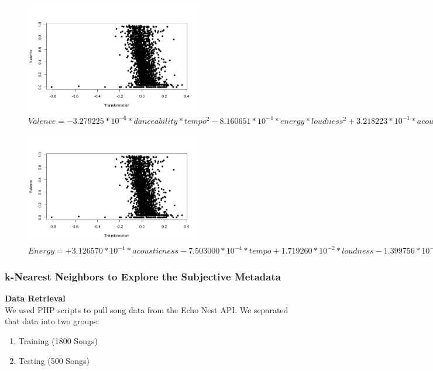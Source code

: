 \documentclass{article}
\begin{document}
\begin{figure}[H]
  \includegraphics[width=3in]{../images/map_valence.png}
  \caption{$ Valence =
      -3.279225 * 10^{-6} * danceability * tempo^{2}
      -8.160651 * 10^{-4} * energy * loudness^{2}
      +3.218223 * 10^{-1} * acousticness * energy^{2}
      -3.279225 * 10^{-6} * liveness * speechiness
      +3.793979 * 10^{-4} * tempo * energy
      -7.492498 * 10^{-3} * loudness * acousticness
      +7.001209 * 10^{-2} * instrumentalness * danceability
      -6.132415 * 10^{-4} * valence * loudness
      +1.359087 * 10^{-2} * energy * loudness *danceability^{2} $}
  \label{valence_mapping}
\end{figure}

\begin{figure}[H]
  \includegraphics[width=3in]{../images/map_valence.png}
  \caption{$ Energy =
      +3.126570 * 10^{-1} * acousticness
      -7.503000 * 10^{-4} * tempo
      +1.719260 * 10^{-2} * loudness
      -1.399756 * 10^{-1} * valence
      +2.950410 * 10^{-2} * danceability
      -2.433880 * 10^{-1} * speechiness
      +1.868210 * 10^{-2} * loudness * danceability $}
  \label{energy_mapping}
\end{figure}

\subsubsection{k-Nearest Neighbors to Explore the Subjective Metadata}
\textbf{Data Retrieval}\\
We used PHP scripts to pull song data from the Echo Nest API.
We separated that data into two groups:
\begin{enumerate}
\item Training (1800 Songs)
\item Testing (500 Songs)
\end{enumerate}
\end{document}

